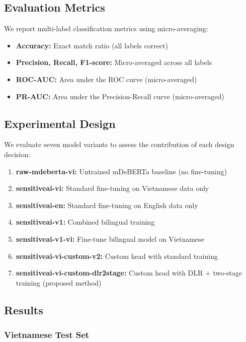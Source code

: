 \documentclass[12pt,a4paper]{article}
\begin{document}
\subsection{Evaluation Metrics}

We report multi-label classification metrics using micro-averaging:
\begin{itemize}[leftmargin=*]
    \item \textbf{Accuracy:} Exact match ratio (all labels correct)
    \item \textbf{Precision, Recall, F1-score:} Micro-averaged across all labels
    \item \textbf{ROC-AUC:} Area under the ROC curve (micro-averaged)
    \item \textbf{PR-AUC:} Area under the Precision-Recall curve (micro-averaged)
\end{itemize}

\subsection{Experimental Design}

We evaluate seven model variants to assess the contribution of each design decision:

\begin{enumerate}[leftmargin=*]
    \item \textbf{raw-mdeberta-vi:} Untrained mDeBERTa baseline (no fine-tuning)
    \item \textbf{sensitiveai-vi:} Standard fine-tuning on Vietnamese data only
    \item \textbf{sensitiveai-en:} Standard fine-tuning on English data only
    \item \textbf{sensitiveai-v1:} Combined bilingual training
    \item \textbf{sensitiveai-v1-vi:} Fine-tune bilingual model on Vietnamese
    \item \textbf{sensitiveai-vi-custom-v2:} Custom head with standard training
    \item \textbf{sensitiveai-vi-custom-dlr2stage:} Custom head with DLR + two-stage training (proposed method)
\end{enumerate}

\subsection{Results}

\subsubsection{Vietnamese Test Set}
\end{document}
